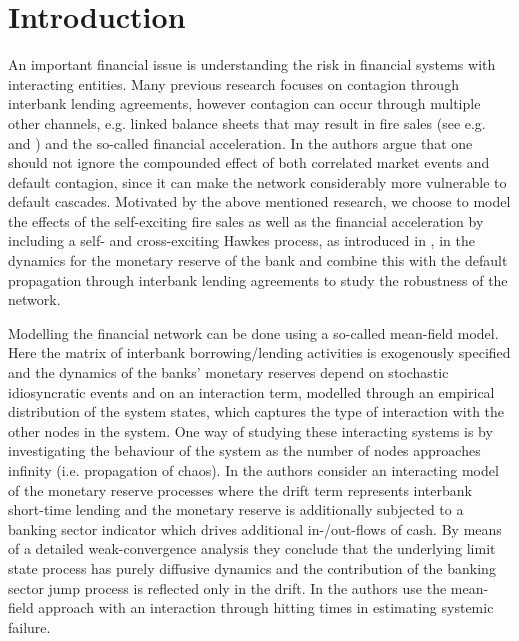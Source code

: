 \documentclass[10pt]{article}
\theoremstyle{plain}
\theoremstyle{definition}
\newcommand{\<}{\langle}
\renewcommand{\>}{\rangle}
\renewcommand{\(}{\left(}
\renewcommand{\)}{\right)}
\renewcommand{\[}{\left[}
\renewcommand{\]}{\right]}
\begin{document}
\section{Introduction}
An important financial issue is understanding the risk in financial systems with interacting entities. Many previous research focuses on contagion through interbank lending agreements, however contagion can occur through multiple other channels, e.g. linked balance sheets that may result in fire sales
(see e.g. \citet{capponi15a} and \citet{chen14}) and the so-called financial acceleration. %
 In \citet{cont10} the authors argue that one should not
ignore the compounded effect of both correlated market events and default contagion, since it can make the network considerably more vulnerable to default cascades. Motivated by the above mentioned research, we choose to model the effects of the self-exciting fire sales as well as the financial acceleration by including a self- and cross-exciting Hawkes process, as introduced in \citet{hawkes71}, in the dynamics for the monetary reserve of the bank and combine this with the default propagation through interbank lending agreements to study the robustness of the network.

Modelling the financial network can be done using a so-called mean-field model. Here the matrix of interbank borrowing/lending activities is exogenously specified and the dynamics of the banks' monetary reserves depend on stochastic idiosyncratic events and on an interaction term, modelled through an empirical distribution of the system states, which captures the type of interaction with the other nodes in the system. One way of studying these interacting systems is by investigating the behaviour of the system as the number of nodes approaches infinity (i.e. propagation of chaos). In \citet{capponi15} the authors consider an interacting model of the monetary reserve processes where the drift term represents interbank short-time lending and the monetary reserve is additionally subjected to a banking sector indicator which drives additional in-/out-flows of cash. By means of a detailed weak-convergence analysis they conclude that the underlying limit state process has purely diffusive dynamics and the contribution of the banking sector jump process is reflected only in the drift. In \citet{nadtochiy17} the authors use the mean-field approach with an interaction through hitting times in estimating systemic failure. 
\end{document}
